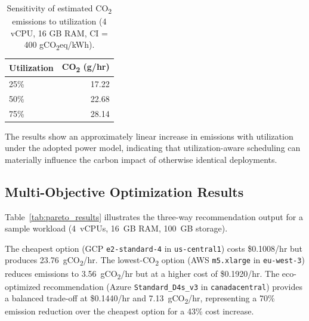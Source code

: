\documentclass[12pt]{article}
\begin{document}
\begin{table}[htbp]
\centering
\caption{Sensitivity of estimated CO\textsubscript{2} emissions to utilization (4 vCPU, 16 GB RAM, CI = 400 gCO\textsubscript{2}eq/kWh).}
\label{tab:utilization_sensitivity}
\small
\begin{tabular}{lr}
\toprule
\textbf{Utilization} & \textbf{CO\textsubscript{2} (g/hr)} \\
\midrule
25\% & 17.22 \\
50\% & 22.68 \\
75\% & 28.14 \\
\bottomrule
\end{tabular}
\end{table}

The results show an approximately linear increase in emissions with utilization under the adopted power model, indicating that utilization-aware scheduling can materially influence the carbon impact of otherwise identical deployments.

\subsection{Multi-Objective Optimization Results}

Table~\ref{tab:pareto_results} illustrates the three-way recommendation output for a sample workload (4~vCPUs, 16~GB RAM, 100~GB storage).

\begin{table}[htbp]
\centering
\caption{Multi-objective recommendation comparison for 4 vCPU, 16 GB workload.}
\label{tab:pareto_results}
\small
{}
\end{table}

The cheapest option (GCP \texttt{e2-standard-4} in \texttt{us-central1}) costs \$0.1008/hr but produces 23.76~gCO\textsubscript{2}/hr. The lowest-CO\textsubscript{2} option (AWS \texttt{m5.xlarge} in \texttt{eu-west-3}) reduces emissions to 3.56~gCO\textsubscript{2}/hr but at a higher cost of \$0.1920/hr. The eco-optimized recommendation (Azure \texttt{Standard\_D4s\_v3} in \texttt{canadacentral}) provides a balanced trade-off at \$0.1440/hr and 7.13~gCO\textsubscript{2}/hr, representing a 70\% emission reduction over the cheapest option for a 43\% cost increase.
\end{document}
